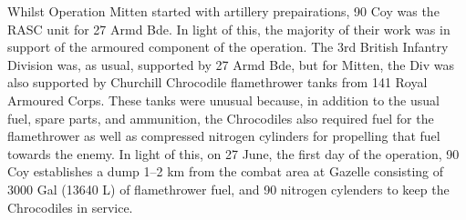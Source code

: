 \documentclass[noraggedright]{turabian-researchpaper}
\begin{document}



		
Whilst Operation Mitten started with artillery prepairations, 90 Coy was the
RASC unit for 27 Armd Bde.  In light of this, the majority of their 
work was in support of the armoured component of the operation.  The 3rd
British Infantry Division was, as usual, supported by 27 Armd Bde, but for
Mitten, the Div was also supported by Churchill Chrocodile flamethrower tanks
from 141 Royal Armoured Corps.  These tanks were unusual because, in addition
to the usual fuel, spare parts, and ammunition, the Chrocodiles also required
fuel for the flamethrower as well as compressed nitrogen cylinders for 
propelling that fuel towards the enemy.  In light of this, on 27 June, the 
first day of the operation, 90 Coy establishes
a dump 1--2 km from the combat area at Gazelle consisting of 3000 Gal (13640 L)
of flamethrower fuel, and 90 nitrogen cylenders to keep the Chrocodiles in
service.\autocite[27 June 1944]{90wd}
\end{document}
